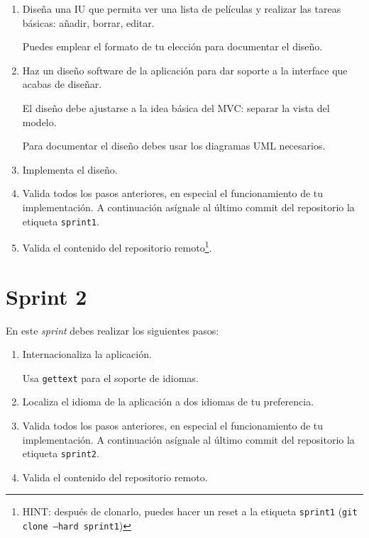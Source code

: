 \documentclass[11pt,a4paper]{article}
\begin{document}
\begin{enumerate}
\item Diseña una IU que permita ver una lista de películas y realizar
las tareas básicas: añadir, borrar, editar.

  Puedes emplear el formato de tu elección para documentar el diseño.

\item Haz un diseño software de la aplicación para dar soporte a la
  interface que acabas de diseñar.

  El diseño debe ajustarse a la idea básica del MVC: separar la vista
  del modelo.

  Para documentar el diseño debes usar los diagramas UML necesarios.

\item Implementa el diseño.

\item Valida todos los pasos anteriores, en especial el funcionamiento
  de tu implementación. A continuación asígnale al último commit del
  repositorio la etiqueta \texttt{sprint1}.

\item Valida el contenido del repositorio remoto\footnote{HINT:
    después de clonarlo, puedes hacer un reset a la etiqueta
    \texttt{sprint1} (\texttt{git clone --hard sprint1})}.
\end{enumerate}



\section{Sprint 2}

En este \emph{sprint} debes realizar los siguientes pasos:

\begin{enumerate}
\item Internacionaliza la aplicación.

  Usa \texttt{gettext} para el soporte de idiomas.

\item Localiza el idioma de la aplicación a dos idiomas de tu
  preferencia.

\item Valida todos los pasos anteriores, en especial el funcionamiento
  de tu implementación. A continuación asígnale al último commit del
  repositorio la etiqueta \texttt{sprint2}.

\item Valida el contenido del repositorio remoto.
\end{enumerate}
\end{document}
